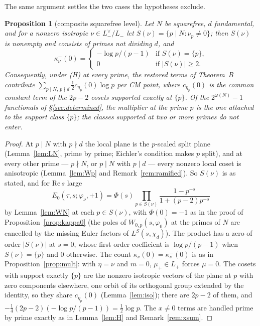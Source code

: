 \documentclass[11pt,reqno]{amsart}
\theoremstyle{plain}
\newtheorem{proposition}[theorem]{Proposition}
\theoremstyle{definition}
\newcommand{\Lm}{L_{-}}
\newcommand{\Lp}{L_{+}}
\begin{document}
The same argument settles the two cases the hypotheses exclude.

\begin{proposition}[composite squarefree level]\label{prop:composite}
Let $N$ be squarefree, $d$ fundamental, and for a nonzero isotropic $\nu\in\Lm^\vee/\Lm$ let
$S(\nu)=\{p\mid N:\nu_p\neq0\}$; then $S(\nu)$ is nonempty and consists of primes not dividing
$d$, and
\[
  \kappa^-_\nu(0)=\begin{cases}-\log p/(p-1)&\text{if }S(\nu)=\{p\},\\ 0&\text{if }\lvert S(\nu)
  \rvert\ge2.\end{cases}
\]
Consequently, under (H) at every prime, the restored terms of Theorem~B contribute
$\sum_{p\mid N,\,p\nmid d}\tfrac12c_{\eta_p}(0)\log p$ per CM point, where $c_{\eta_p}(0)$ is the
common constant term of the $2p-2$ cosets supported exactly at $\{p\}$. Of the $2^{\omega(N)}-1$
functionals of \S\ref{sec:determined}, the multiplier at the prime $p$ is the one attached to the
support class $\{p\}$; the classes supported at two or more primes do not enter.
\end{proposition}
\begin{proof}
At $p\mid N$ with $p\nmid d$ the local plane is the $p$-scaled split plane (Lemma~\ref{lem:LN},
prime by prime; Eichler's condition makes $p$ split), and at every other prime --- $p\nmid N$, or
$p\mid N$ with $p\mid d$ --- every nonzero local coset is anisotropic (Lemma~\ref{lem:Wp} and
Remark~\ref{rem:ramified}). So $S(\nu)$ is as stated, and for $\mathrm{Re}\,s$ large
\[
  E_0(\tau,s;\varphi_\nu,+1)=\Phi(s)\prod_{p\in S(\nu)}\frac{1-p^{-s}}{1+(p-2)p^{-s}}
\]
by Lemma~\ref{lem:WN} at each $p\in S(\nu)$, with $\Phi(0)=-1$ as in the proof of
Proposition~\ref{prop:kappa0} (the poles of $W_{0,p}(s,\varphi_0)$ at the primes of $N$ are
cancelled by the missing Euler factors of $L^S(s,\chi_d)$). The product has a zero of order
$\lvert S(\nu)\rvert$ at $s=0$, whose first-order coefficient is $\log p/(p-1)$ when
$S(\nu)=\{p\}$ and $0$ otherwise. The count $\kappa_\nu(0)=\kappa^-_\nu(0)$ is as in
Proposition~\ref{prop:mult}: with $\eta=\nu$ and $m=0$, $\mu_+\in\Lp$ forces $\mu=0$. The cosets
with support exactly $\{p\}$ are the nonzero isotropic vectors of the plane at $p$ with zero
components elsewhere, one orbit of its orthogonal group extended by the identity, so they share
$c_{\eta_p}(0)$ (Lemma~\ref{lem:iso}); there are $2p-2$ of them, and
$-\tfrac14(2p-2)(-\log p/(p-1))=\tfrac12\log p$. The $x\neq0$ terms are handled prime by prime
exactly as in Lemma~\ref{lem:H} and Remark~\ref{rem:xsum}.
\end{proof}
\end{document}
